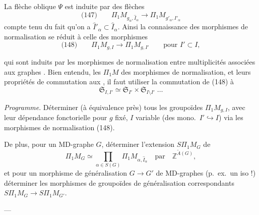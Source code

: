 \documentclass[11pt,a4paper]{article}
\begin{document}
La flèche oblique $\Psi$ est induite par des flèches
\[
  \text{(147)}\qquad \Pi_1 M_{g_\alpha, \hat{I}_\alpha} \longrightarrow \Pi_1 M_{g'_\alpha, \hat{I}'_\alpha}
\]
compte tenu du fait qu'on a $\hat{I}'_\alpha \subset \hat{I}_\alpha$.
Ainsi la connaissance des morphismes de normalisation  \ill{} se
réduit à celle des morphismes
\[
  \text{(148)}\qquad \Pi_1 M_{g,I} \longrightarrow \Pi_1 M_{g,I'} \qquad \text{pour } I' \subset I,
\]

qui sont induits par les morphismes de normalisation entre multiplicités
associées aux graphes . Bien entendu, 
\struck{\ill{}}  les $\Pi_1 M$ des morphismes de normalisation, et
leurs propriétés de commutation aux , il faut utiliser la
 commutation de (148) à
\[
  \mathfrak{S}_{I,I'} \simeq \mathfrak{S}_{I'} \times \mathfrak{S}_{I\setminus I'} \;\ldots
\]

\emph{Programme}. Déterminer (à équivalence  près) tous les groupoïdes
$\Pi_1 M_{g,I}$, avec leur dépendance fonctorielle pour $g$ fixé, $I$ variable
(des mono.\ $I' \hookrightarrow I$) via les morphismes de normalisation (148).

De plus, pour \struck{\ill{}} un MD-graphe $G$, déterminer l'extension
$S\Pi_1 M_G$ de
\[
  \Pi_1 M_G \simeq \prod_{\alpha\in S(G)} \Pi_1 M_{\alpha, \hat{I}_\alpha} \quad\text{par}\quad \mathbb{Z}^{\tilde{A}(G)},
\]
et pour un morphisme de généralisation \struck{\ill{}} $G \to G'$ de MD-graphes
(p.~ex.\ un iso !)  déterminer les morphismes de groupoïdes de
généralisation correspondants $S\Pi_1 M_G \to S\Pi_1 M_{G'}$.


 --- \struck{\ill{}} 
 
\end{document}
